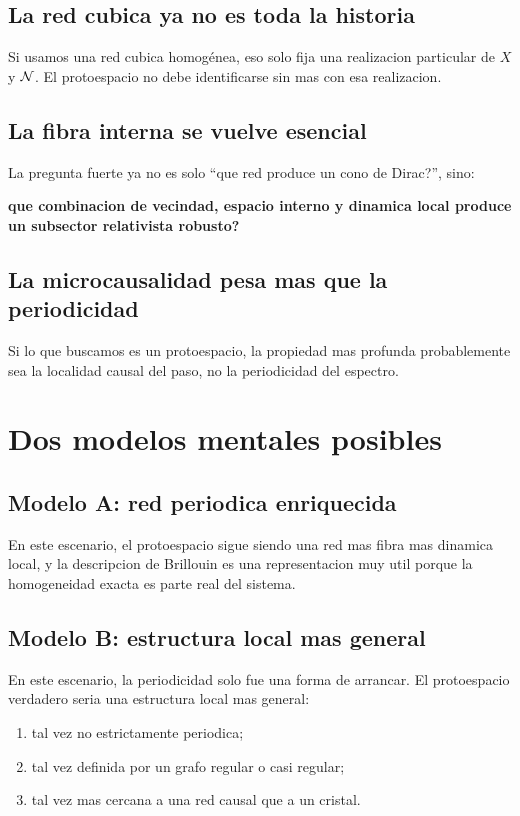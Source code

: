 \subsection{La red cubica ya no es toda la historia}
Si usamos una red cubica homogénea, eso solo fija una realizacion particular de \(X\) y \(\mathcal{N}\). El protoespacio no debe identificarse sin mas con esa realizacion.

\subsection{La fibra interna se vuelve esencial}
La pregunta fuerte ya no es solo \enquote{que red produce un cono de Dirac?}, sino:
\begin{displayquote}
\textbf{que combinacion de vecindad, espacio interno y dinamica local produce un subsector relativista robusto?}
\end{displayquote}

\subsection{La microcausalidad pesa mas que la periodicidad}
Si lo que buscamos es un protoespacio, la propiedad mas profunda probablemente sea la localidad causal del paso, no la periodicidad del espectro.

\section{Dos modelos mentales posibles}
\subsection{Modelo A: red periodica enriquecida}
En este escenario, el protoespacio sigue siendo una red mas fibra mas dinamica local, y la descripcion de Brillouin es una representacion muy util porque la homogeneidad exacta es parte real del sistema.

\subsection{Modelo B: estructura local mas general}
En este escenario, la periodicidad solo fue una forma de arrancar. El protoespacio verdadero seria una estructura local mas general:
\begin{enumerate}[label=\arabic*.]
    \item tal vez no estrictamente periodica;
    \item tal vez definida por un grafo regular o casi regular;
    \item tal vez mas cercana a una red causal que a un cristal.
\end{enumerate}

